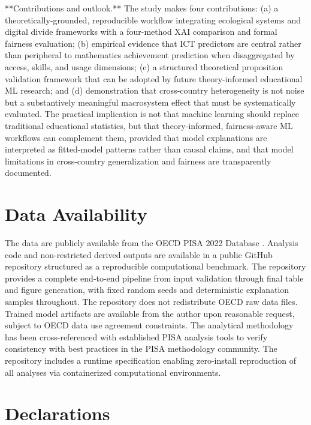 \documentclass[pdflatex,sn-mathphys-ay]{sn-jnl}
\begin{document}
**Contributions and outlook.** The study makes four contributions: (a) a theoretically-grounded, reproducible workflow integrating ecological systems and digital divide frameworks with a four-method XAI comparison and formal fairness evaluation; (b) empirical evidence that ICT predictors are central rather than peripheral to mathematics achievement prediction when disaggregated by access, skills, and usage dimensions; (c) a structured theoretical proposition validation framework that can be adopted by future theory-informed educational ML research; and (d) demonstration that cross-country heterogeneity is not noise but a substantively meaningful macrosystem effect that must be systematically evaluated. The practical implication is not that machine learning should replace traditional educational statistics, but that theory-informed, fairness-aware ML workflows can complement them, provided that model explanations are interpreted as fitted-model patterns rather than causal claims, and that model limitations in cross-country generalization and fairness are transparently documented.

\section{Data Availability}

The data are publicly available from the OECD PISA 2022 Database \citep{OECD_2022_database}. Analysis code and non-restricted derived outputs are available in a public GitHub repository structured as a reproducible computational benchmark. The repository provides a complete end-to-end pipeline from input validation through final table and figure generation, with fixed random seeds and deterministic explanation samples throughout. The repository does not redistribute OECD raw data files. Trained model artifacts are available from the author upon reasonable request, subject to OECD data use agreement constraints. The analytical methodology has been cross-referenced with established PISA analysis tools to verify consistency with best practices in the PISA methodology community. The repository includes a runtime specification enabling zero-install reproduction of all analyses via containerized computational environments.

\backmatter

\section*{Declarations}
\end{document}
